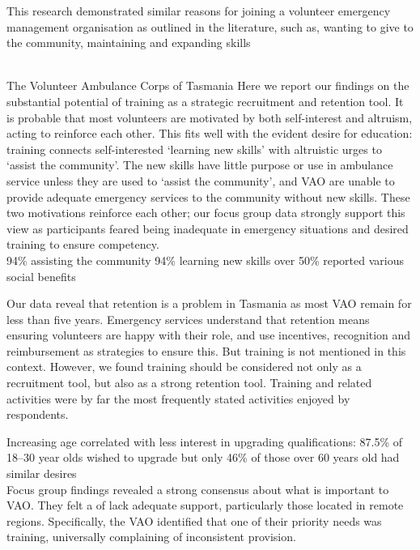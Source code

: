 \documentclass[11pt,fleqn]{book} %
\begin{document}
This research demonstrated similar reasons for joining
a volunteer emergency management organisation as
outlined in the literature, such as, wanting to give to the
community, maintaining and expanding skills


\autocite{fahey_training_2002}\\
 The Volunteer Ambulance Corps of Tasmania 
Here we report our findings on the
substantial potential of training as a strategic recruitment
and retention tool. It is
probable that most volunteers are motivated by both
self-interest and altruism, acting to reinforce each other.
This fits well with the evident desire for education:
training connects self-interested ‘learning new skills’
with altruistic urges to ‘assist the community’. The new
skills have little purpose or use in ambulance service
unless they are used to ‘assist the community’, and VAO
are unable to provide adequate emergency services to
the community without new skills. These two
motivations reinforce each other; our focus group data
strongly support this view as participants feared being
inadequate in emergency situations and desired training
to ensure competency.\\

94\% assisting the community
94\% learning new skills
 over 50\% reported various social benefits
 
 Our data reveal that retention is a problem in
Tasmania as most VAO remain for less than five years.
Emergency services understand that retention means
ensuring volunteers are happy with their role, and use
incentives, recognition and reimbursement as strategies
to ensure this. 
But training is not mentioned in this context.
However, we found training should be considered not
only as a recruitment tool, but also as a strong retention
tool. Training and related activities were by far the most
frequently stated activities enjoyed by respondents.\
 
 
 Increasing age correlated with less interest in
upgrading qualifications: 87.5\% of 18–30 year olds
wished to upgrade but only 46\% of those over 60 years
old had similar desires\\

Focus group findings revealed a strong consensus about
what is important to VAO. They felt a of lack adequate
support, particularly those located in remote regions.
Specifically, the VAO identified that one of their priority
needs was training, universally complaining of
inconsistent provision.\\
\end{document}
